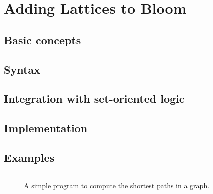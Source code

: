 \section{Adding Lattices to Bloom}
\label{sec:impl}

\subsection{Basic concepts}

\subsection{Syntax}

\subsection{Integration with set-oriented logic}

\subsection{Implementation}

\subsection{Examples}

\begin{figure}[t]
\begin{scriptsize}
\begin{lstlisting}
\end{lstlisting}
\end{scriptsize}
\caption{A simple \lang program to compute the shortest paths in a graph.}
\label{fig:lattice-spaths}
\end{figure}
